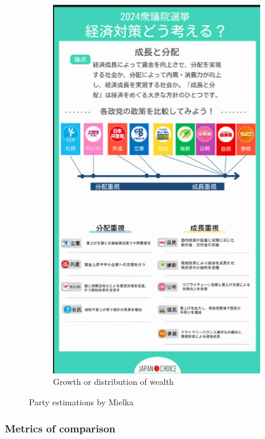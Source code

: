 \documentclass[final,5p,times,twocolumn,authoryear]{elsarticle}
\begin{document}
\begin{figure}[ht]
\begin{subfigure}[t]{0.22\textwidth}
        \includegraphics[width=\linewidth]{figs/mielka/growthordistrib.png}
        \caption{Growth or distribution of wealth}
        \label{fig:growthordistrib}
    \end{subfigure}
    \caption{Party estimations by Mielka \citep{Mielka}}
    \label{fig:mielka-figs}
\end{figure}

\subsubsection{Metrics of comparison}
\end{document}

